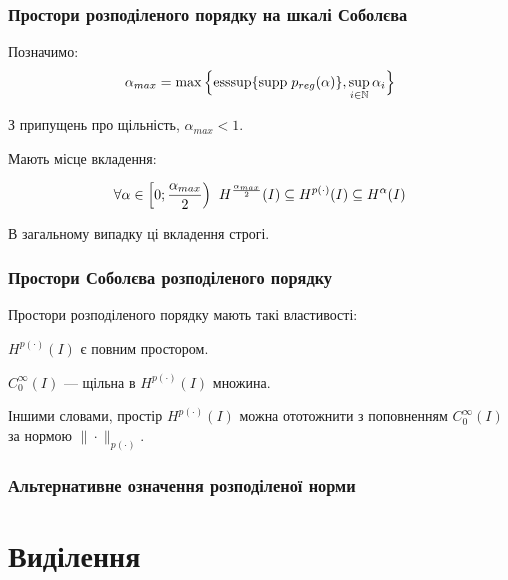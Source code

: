 \documentclass[ukrainian]{beamer}
\newcommand{\NN}{\mathbb{N}}
\begin{document}
\begin{frame}
\frametitle{Простори розподіленого порядку на шкалі Соболєва}

Позначимо:
\begin{equation}
\alpha_{max}=\max\Big\{\mathrm{esssup}\{\mathrm{supp}\hspace{1mm}p_{reg}(\alpha)\},\sup_{i\in\NN}\alpha_i\Big\}
\end{equation}

З припущень про щільність, $\alpha_{max}<1$.

\begin{proposition}
Мають місце вкладення:

\begin{equation}\label{sob_scale}
\forall{\alpha\in\left[0;\frac{\alpha_{max}}{2}\right)}\hspace{2mm}H^{\frac{\alpha_{max}}{2}}(I)\subseteq{H}^{p(\cdot)}(I)\subseteq H^\alpha(I)
\end{equation}

\end{proposition}

В загальному випадку ці вкладення строгі.
\end{frame}

\begin{frame}
\frametitle{Простори Соболєва розподіленого порядку}

Простори розподіленого порядку мають такі властивості:

\begin{proposition}\label{completeness}
$H^{p(\cdot)}(I)$ є повним простором.
\end{proposition}

\begin{proposition}\label{density}
$C_0^{\infty}(I)$ --- щільна в $H^{p(\cdot)}(I)$ множина.
\end{proposition}

Іншими словами, простір $H^{p(\cdot)}(I)$ можна ототожнити з поповненням $C_0^{\infty}(I)$ за нормою $\|\cdot\|_{p(\cdot)}$.

\end{frame}

\begin{frame}
\frametitle{Альтернативне означення розподіленої норми}

\end{frame}

\section{Виділення}
\end{document}
